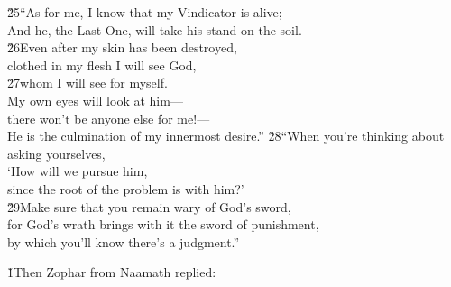 \begin{poetry}
\poeml \v{25}``As for me, I know that my Vindicator is alive; \\
\poemll    And he, the Last One, will take his stand on the soil. \\
\poeml \v{26}Even after my skin has been destroyed, \\
\poemll    clothed in my flesh I will see God, \\
\poeml \v{27}whom I will see for myself. \\
\poeml My own eyes will look at him--- \\
\poemll    there won't be anyone else for me!--- \\
\poemlll       He is the culmination of my innermost desire.''
\poeml \v{28}``When you're thinking about asking yourselves, \\
\poemll    `How will we pursue him, \\
\poemlll       since the root of the problem is with him?' \\
\poeml \v{29}Make sure that you remain wary of God's sword, \\
\poemll    for God's wrath brings with it the sword of punishment, \\
\poemlll       by which you'll know there's a judgment.''
\end{poetry}

\v{1}Then Zophar from Naamath replied:

